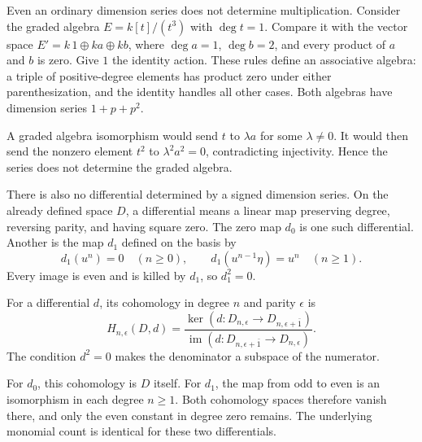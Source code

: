 Even an ordinary dimension series does not determine multiplication.
Consider the graded algebra $E=k[t]/(t^3)$ with $\deg t=1$.
Compare it with the vector space
$E'=k\,1\oplus k a\oplus k b$,
where $\deg a=1$, $\deg b=2$, and every product of $a$ and $b$ is zero.
Give $1$ the identity action. These rules define an associative algebra:
a triple of positive-degree elements has product zero under either
parenthesization, and the identity handles all other cases.
Both algebras have dimension series $1+p+p^2$.

A graded algebra isomorphism would send $t$ to $\lambda a$ for some
$\lambda\ne0$. It would then send the nonzero element $t^2$ to
$\lambda^2a^2=0$, contradicting injectivity. Hence the series does not
determine the graded algebra.

There is also no differential determined by a signed dimension series.
On the already defined space $D$, a differential means a linear map
preserving degree, reversing parity, and having square zero.
The zero map $d_0$ is one such differential.
Another is the map $d_1$ defined on the basis by
\[
 d_1(u^n)=0\quad(n\geq0),\qquad
 d_1(u^{n-1}\eta)=u^n\quad(n\geq1).
\]
Every image is even and is killed by $d_1$, so $d_1^2=0$.

For a differential $d$, its cohomology in degree $n$ and parity $\epsilon$
is
\[
 H_{n,\epsilon}(D,d)=
 \frac{\ker(d:D_{n,\epsilon}\to D_{n,\epsilon+\bar1})}
      {\operatorname{im}(d:D_{n,\epsilon+\bar1}\to D_{n,\epsilon})}.
\]
The condition $d^2=0$ makes the denominator a subspace of the numerator.

For $d_0$, this cohomology is $D$ itself.
For $d_1$, the map from odd to even is an isomorphism in each degree
$n\geq1$. Both cohomology spaces therefore vanish there, and only the
even constant in degree zero remains.
The underlying monomial count is identical for these two differentials.
